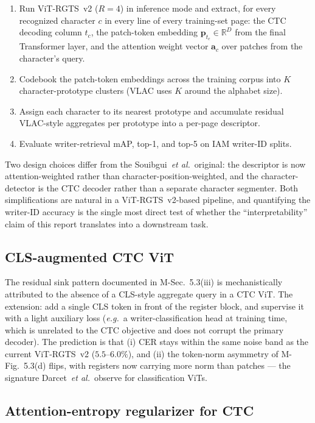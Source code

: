 \documentclass[11pt,a4paper]{article}
\newcommand{\eg}{\textit{e.g.}}
\newcommand{\etal}{\textit{et al.}}
\begin{document}
\begin{enumerate}
    \item Run ViT-RGTS~v2 ($R = 4$) in inference mode and extract, for every recognized character $c$ in every line of every training-set page: the CTC decoding column $t_c$, the patch-token embedding $\mathbf{p}_{t_c} \in \mathbb{R}^{D}$ from the final Transformer layer, and the attention weight vector $\mathbf{a}_c$ over patches from the character's query.
    \item Codebook the patch-token embeddings across the training corpus into $K$ character-prototype clusters (VLAC uses $K$ around the alphabet size).
    \item Assign each character to its nearest prototype and accumulate residual VLAC-style aggregates per prototype into a per-page descriptor.
    \item Evaluate writer-retrieval mAP, top-1, and top-5 on IAM writer-ID splits.
\end{enumerate}

Two design choices differ from the Souibgui~\etal\ original: the descriptor is now attention-weighted rather than character-position-weighted, and the character-detector is the CTC decoder rather than a separate character segmenter. Both simplifications are natural in a ViT-RGTS~v2-based pipeline, and quantifying the writer-ID accuracy is the single most direct test of whether the ``interpretability'' claim of this report translates into a downstream task.

\subsection{CLS-augmented CTC ViT}

The residual sink pattern documented in M-Sec.~5.3(iii) is mechanistically attributed to the absence of a CLS-style aggregate query in a CTC ViT. The extension: add a single CLS token in front of the register block, and supervise it with a light auxiliary loss (\eg\ a writer-classification head at training time, which is unrelated to the CTC objective and does not corrupt the primary decoder). The prediction is that (i) CER stays within the same noise band as the current ViT-RGTS~v2 ($5.5$--$6.0\%$), and (ii) the token-norm asymmetry of M-Fig.~5.3(d) flips, with registers now carrying more norm than patches --- the signature Darcet~\etal\ observe for classification ViTs.

\subsection{Attention-entropy regularizer for CTC}
\end{document}
